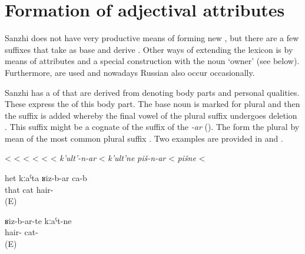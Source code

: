 
\section{Formation of adjectival attributes}
\label{sec:Derivation of adjectives}
Sanzhi does not have very productive means of forming new , but there are a few suffixes that take  as base and derive . Other ways of extending the lexicon is by means of  attributes and a special construction with the noun `owner' (see below). Furthermore,  are used and nowadays Russian  also occur occasionally.  

Sanzhi has a  of  that are derived from  denoting body parts and personal qualities. These  express the  of this body part. The base noun is marked for plural and then the suffix  is added whereby the final vowel of the plural suffix undergoes deletion . This suffix might be a cognate of the  suffix of the  \textit{-ar} (). The  form the plural by mean of the most common plural suffix . Two examples are provided in  and .
%
\begin{exe}
	\ex	\label{ex:adjectivesWithBAR}
	\begin{xlist}
		\TabPositions{16em}
		\ex	{} 					\tab <  
		\ex	{} 					\tab	<  
		\ex	{}  	\tab	<   
		\ex	{}  	\tab	 <   	
		\ex	{}  \tab	 <  
		\ex	{}  \tab	<   
		\ex \textit{k'ult'-n-ar}  \tab	< \textit{k'ult'ne} 
		\ex \textit{piš-n-ar}  \tab	< \textit{pišne} 
		\ex	{} 			\tab	 <  
	\end{xlist}
\end{exe}

\begin{exe}
	\ex
	\begin{xlist}
		\ex	\label{ex:The cat is hairy}
		\gll   	het	kːaˁta	ʁiz-b-ar	ca-b \\
			that	cat	hair-	\tsc{cop-n}\\
		\glt  	\sqt{The cat is hairy.} (E)

		\ex	\label{ex:hairy cats}
		\gll   	ʁiz-b-ar-te kːaˁt-ne \\
			hair-	cat-\tsc{pl} \\
		\glt	\sqt{hairy cats} (E)
	\end{xlist}
\end{exe}

